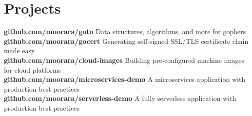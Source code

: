 \documentclass[]{cv-style}                     %
\begin{document}

\section{Projects}

\begin{entrylist}

  \textbf{github.com/moorara/goto} Data structures, algorithms, and more for gophers \\
  \textbf{github.com/moorara/gocert} Generating self-signed SSL/TLS certificate chain made easy \\
  \textbf{github.com/moorara/cloud-images} Building pre-configured machine images for cloud platforms \\
  \textbf{github.com/moorara/microservices-demo} A microservices application with production best practices  \\
  \textbf{github.com/moorara/serverless-demo} A fully serverless application with production best practices  \\




\end{entrylist}


\end{document}
